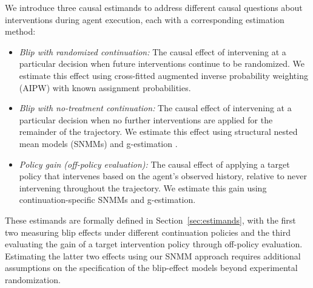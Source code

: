 We introduce three causal estimands to address different causal questions about interventions during agent execution, each with a corresponding estimation method:
\begin{itemize}
    \item {\em Blip with randomized continuation:} 
    The causal effect of intervening at a particular decision when future interventions continue to be randomized.
    We estimate this effect using cross-fitted augmented inverse probability weighting (AIPW) with known assignment probabilities.
    \item {\em Blip with no-treatment continuation:} 
    The causal effect of intervening at a particular decision when no further interventions are applied for the remainder of the trajectory.
    We estimate this effect using structural nested mean models (SNMMs) and g-estimation \citep{robins1994correcting,vansteelandt2014snmm,lewis2020double}.

    \item {\em Policy gain (off-policy evaluation):} 
    The causal effect of applying a target policy that intervenes based on the agent's observed history, relative to never intervening throughout the trajectory.
    We estimate this gain using continuation-specific SNMMs and g-estimation.
\end{itemize}
These estimands are formally defined in Section~\ref{sec:estimands}, with the first two measuring blip effects under different continuation policies and the third evaluating the gain of a target intervention policy through off-policy evaluation.
Estimating the latter two effects using our SNMM approach requires additional assumptions on the specification of the blip-effect models beyond experimental randomization.

